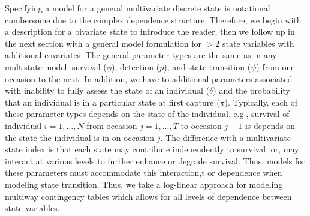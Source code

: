\documentclass[fleqn]{article}
\begin{document}
Specifying a model for a general multivariate discrete state is notational cumbersome due to the complex dependence structure. Therefore, we begin with a description for a bivariate state to introduce the reader, then we follow up in the next section with a general model formulation for $>2$ state variables with additional covariates. The general parameter types are the same as in any multistate model: survival ($\phi$), detection ($p$), and state transition ($\psi$) from one occasion to the next. In addition, we have to additional parameters associated with inability to fully assess the state of an individual ($\delta$) and the probability that an individual is in a particular state at first capture ($\pi$). Typically, each of these parameter types depends on the state of the individual, e.g., survival of individual $i=1,\dots,N$ from occasion $j=1,\dots,T$ to occasion $j+1$ is depends on the state the individual is in on occasion $j$. The difference with a multivariate state index is that each state may contribute independently to survival, or, may interact at various levels to further enhance or degrade survival. Thus, models for these parameters must accommodate this interaction,t or dependence when modeling state transition. Thus, we take a log-linear approach \citep{christensen1997log} for modeling multiway contingency tables which allows for all levels of dependence between state variables.     
\end{document}
